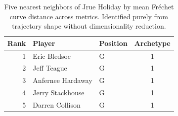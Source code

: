 \begin{table}[htbp]
  \centering\small
  \begin{tabular}{rllc}
    \toprule
    Rank & Player & Position & Archetype \\
    \midrule
    1 & Eric Bledsoe & G & 1 \\
    2 & Jeff Teague & G & 1 \\
    3 & Anfernee Hardaway & G & 1 \\
    4 & Jerry Stackhouse & G & 1 \\
    5 & Darren Collison & G & 1 \\
    \bottomrule
  \end{tabular}
  \caption{Five nearest neighbors of Jrue Holiday by mean Fr\'{e}chet curve distance across metrics. Identified purely from trajectory shape without dimensionality reduction.}
  \label{tab:Jrue_Holiday_frechet_curve_neighbors}
\end{table}

